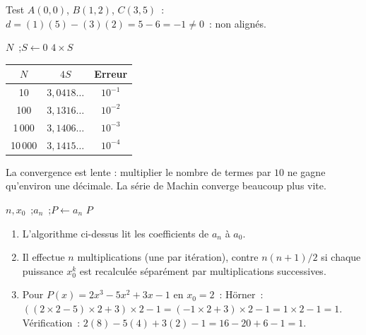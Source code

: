 Test $A(0,0)$, $B(1,2)$, $C(3,5)$~:
$d=(1)(5)-(3)(2)=5-6=-1\ne0$~: non align\'es.\checkmark


\begin{algorithm}[H]
\caption{$\pi$ par Leibniz}
\Lire $N$~;\quad $S \leftarrow 0$\;
\Afficher $4\times S$\;
\end{algorithm}

\begin{center}
\renewcommand{\arraystretch}{1.2}
\begin{tabular}{ccc}
\toprule
$N$ & $4S$ & Erreur\\
\midrule
10 & $3{,}0418\ldots$ & $10^{-1}$\\
100 & $3{,}1316\ldots$ & $10^{-2}$\\
1\,000 & $3{,}1406\ldots$ & $10^{-3}$\\
10\,000 & $3{,}1415\ldots$ & $10^{-4}$\\
\bottomrule
\end{tabular}
\end{center}

La convergence est lente : multiplier le nombre de termes par $10$ ne gagne
qu'environ une décimale. La série de Machin converge beaucoup plus vite.


\begin{algorithm}[H]
\caption{Sch\'ema de H\"orner}
\Lire $n, x_0$~;\quad \Lire $a_n$~;\quad $P \leftarrow a_n$\;
\Afficher $P$\;
\end{algorithm}

\begin{enumerate}
  \item L'algorithme ci-dessus lit les coefficients de $a_n$ \`a $a_0$.
  \item Il effectue $n$ multiplications (une par it\'eration), contre
        $n(n+1)/2$ si chaque puissance $x_0^k$ est recalcul\'ee
        s\'epar\'ement par multiplications successives.
  \item Pour $P(x)=2x^3-5x^2+3x-1$ en $x_0=2$~:
        H\"orner~: $((2\times2-5)\times2+3)\times2-1=(-1\times2+3)\times2-1=1\times2-1=1$.
        V\'erification~: $2(8)-5(4)+3(2)-1=16-20+6-1=1$.\checkmark
\end{enumerate}

